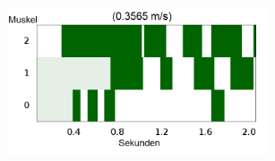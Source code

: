 \documentclass{beamer}
\begin{document}
\begin{frame}
\begin{columns}
\begin{figure}
		\end{figure}
		\begin{figure}
			\includegraphics[width=0.9\textwidth]{img/hum16.png}
		\end{figure}
	\end{columns}
\end{frame}
\end{document}
